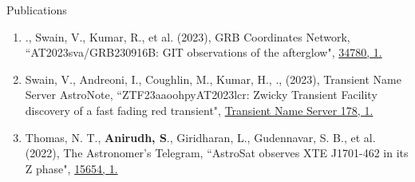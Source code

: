 \begin{section}{Publications}
\begin{enumerate}
        \item \me., Swain, V., Kumar, R., et al. (2023), GRB Coordinates Network, {``AT2023sva/GRB230916B: GIT observations of the afterglow"}, \href{https://gcn.nasa.gov/circulars/34780}{34780, 1.}
        
        \vspace{-0.2em}
        
        

        \item Swain, V., Andreoni, I., Coughlin, M., Kumar, H., \me., (2023), Transient Name Server AstroNote, {``ZTF23aaoohpy\/AT2023lcr: Zwicky Transient Facility discovery of a fast fading red transient"}, \href{https://www.wis-tns.org/astronotes/astronote/2023-178}{Transient Name Server 178, 1.}
        
        \vspace{-0.2em}

        \item Thomas, N. T., \textbf{Anirudh, S}., Giridharan, L., Gudennavar, S. B., et al. (2022), The Astronomer's Telegram, {``AstroSat observes XTE J1701-462 in its Z phase"}, \href{https://www.astronomerstelegram.org/?read=15654}{15654, 1.}
    \end{enumerate}

\end{section}
